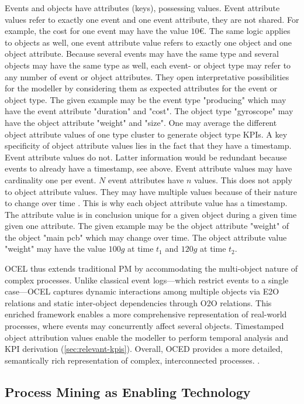 Events and objects have attributes (keys), possessing values. Event attribute values refer to exactly one event and one event attribute, they are not shared. For example, the cost for one event may have the value $10€$. The same logic applies to objects as well, one event attribute value refers to exactly one object and one object attribute. Because several events may have the same type and several objects may have the same type as well, each event- or object type may refer to any number of event or object attributes. They open interpretative possibilities for the modeller by considering them as expected attributes for the event or object type. The given example may be the event type "producing" which may have the event attribute "duration" and "cost". The object type "gyroscope" may have the object attribute "weight" and "size". One may average the different object attribute values of one type cluster to generate object type KPIs. A key specificity of object attribute values lies in the fact that they have a timestamp. Event attribute values do not. Latter information would be redundant because events to already have a timestamp, see above. Event attribute values may have cardinality one per event. $N$ event attributes have $n$ values. This does not apply to object attribute values. They may have multiple values because of their nature to change over time \autocite{van2023object}. This is why each object attribute value has a timestamp. The attribute value is in conclusion unique for a given object during a given time given one attribute. The given example may be the object attribute "weight" of the object "main pcb" which may change over time. The object attribute value "weight" may have the value $100g$ at time $t_1$ and $120g$ at time $t_2$.

OCEL thus extends traditional PM by accommodating the  multi-object nature of complex processes. Unlike classical event logs—which restrict events to a single case—OCEL captures dynamic interactions among multiple objects via E2O relations and static inter-object dependencies through O2O relations. This enriched framework enables a more comprehensive representation of real-world processes, where events may concurrently affect several objects. Timestamped object attribution values enable the modeller to perform temporal analysis and KPI derivation (\autoref{sec:relevant-kpis}). Overall, OCED provides a more detailed, semantically rich representation of complex, interconnected processes. \autocite{van2023object}.

\subsection{Process Mining as Enabling Technology}
\label{sec:process-mining-enabling-technology}

